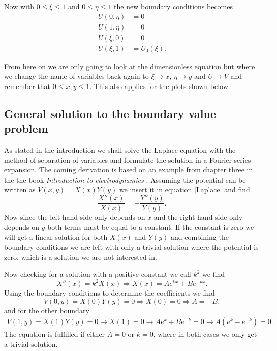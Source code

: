 \documentclass{article}
\begin{document}
Now with $0 \leq \xi \leq 1$ and $0 \leq \eta \leq 1$ the new boundary conditions becomes 
\begin{equation}
    \begin{split}
        U(0,\eta) &= 0 \\
        U(1,\eta) &= 0 \\
        U(\xi,0) &=0 \\
        U(\xi,1) &= U_0(\xi).
    \end{split}
\end{equation}

From here on we are only going to look at the dimensionless equation but where we change the name of variables back again to $\xi \rightarrow x$, $\eta \rightarrow y$ and $U \rightarrow V$ and remember that $0 \leq x,y \leq 1$. This also applies for the plots shown below. 

\subsection*{General solution to the boundary value problem}
As stated in the introduction we shall solve the Laplace equation with the method of separation of variables and formulate the solution in a Fourier series expansion. The coming derivation is based on an example from chapter three in the the book \emph{Introduction to electrodynamics} \cite{Griffiths}. Assuming the potential can be written as $V(x,y)=X(x)Y(y)$ we insert it in equation \eqref{Laplace} and find
\begin{equation}
    \frac{X''(x)}{X(x)} = - \frac{Y''(y)}{Y(y)}.
\end{equation}
Now since the left hand side only depends on $x$ and the right hand side only depends on $y$ both terms must be equal to a constant. If the constant is zero we will get a linear solution for both $X(x)$ and $Y(y)$ and combining the boundary conditions we are left with only a trivial solution where the potential is zero, which is a solution we are not interested in.

Now checking for a solution with a positive constant we call $k^2$ we find
\begin{equation}
    X''(x) = k^2X(x) \Rightarrow X(x) = A e^{k x}+Be^{-k x}.
\end{equation}
Using the boundary conditions to determine the coefficients we find
\begin{equation}
    V(0,y) = X(0)Y(y) = 0 \Rightarrow X(0) = 0 \Rightarrow A = -B,
\end{equation}
and for the other boundary 
\begin{equation}
\begin{split}
    V(1,y) = X(1)Y(y) = 0 \rightarrow X(1)=0 \rightarrow A e^{k} + Be^{-k}=0 \rightarrow A(e^k-e^{-k})=0.
\end{split}
\end{equation}
The equation is fulfilled if either $A=0$ or $k=0$, where in both cases we only get a trivial solution.
\end{document}
